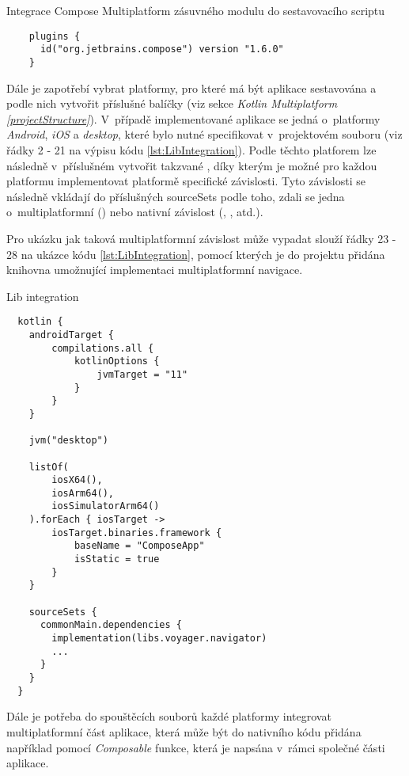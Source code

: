 \begin{listing}[H]
\caption{Integrace Compose Multiplatform zásuvného modulu do sestavovacího scriptu}\label{lst:ComposePlugin}
\begin{verbatim}
    plugins {
      id("org.jetbrains.compose") version "1.6.0"
    }
\end{verbatim}
\end{listing}

Dále je zapotřebí vybrat platformy, pro které má být aplikace sestavována a podle nich vytvořit příslušné balíčky (viz sekce \textit{Kotlin Multiplatform \ref{projectStructure}}).
V~případě implementované aplikace se jedná o~platformy \textit{Android}, \textit{iOS} a \textit{desktop}, které bylo nutné specifikovat v~projektovém 
souboru  (viz řádky 2 - 21 na výpisu kódu \ref{lst:LibIntegration}).
Podle těchto platforem lze následně v~příslušném  vytvořit takzvané , díky kterým je možné
pro každou platformu implementovat platformě specifické závislosti. Tyto závislosti se následně vkládají do příslušných
sourceSets podle toho, zdali se jedna o~multiplatformní () nebo nativní závislost (, , atd.).

Pro ukázku jak taková multiplatformní závislost může vypadat slouží řádky 23 - 28 na ukázce kódu \ref{lst:LibIntegration}, pomocí 
kterých je do projektu přidána knihovna umožnující implementaci multiplatformní navigace.

\begin{listing}[H]
\caption{Lib integration}\label{lst:LibIntegration}
\begin{verbatim}
  kotlin {
    androidTarget {
        compilations.all {
            kotlinOptions {
                jvmTarget = "11"
            }
        }
    }

    jvm("desktop")

    listOf(
        iosX64(),
        iosArm64(),
        iosSimulatorArm64()
    ).forEach { iosTarget ->
        iosTarget.binaries.framework {
            baseName = "ComposeApp"
            isStatic = true
        }
    }

    sourceSets {
      commonMain.dependencies {
        implementation(libs.voyager.navigator)
        ...
      }
    }
  }  
\end{verbatim}
\end{listing}

Dále je potřeba do spouštěcích souborů každé platformy integrovat multiplatformní část aplikace, která může být do nativního kódu přidána
například pomocí \textit{Composable} funkce, která je napsána v~rámci společné části aplikace.

